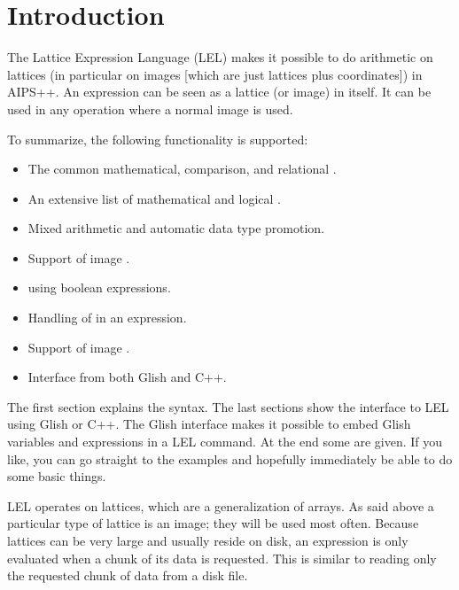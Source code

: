 
\section{Introduction}

The Lattice Expression Language (LEL) makes it possible to do arithmetic
on lattices (in particular on images [which are just lattices plus
coordinates]) in AIPS++.  An expression can be seen as a lattice (or
image) in itself.  It can be used in any operation where a normal image
is used. 

To summarize, the following functionality is supported:
\begin{itemize}
\item The common mathematical, comparison, and relational
      .
\item An extensive list of mathematical and logical
      .
\item Mixed  arithmetic
      and automatic data type promotion.
\item Support of image .
\item {} using boolean expressions.
\item Handling of  in an expression.
\item Support of image .
\item Interface from both Glish and C++.
\end{itemize}

The first section explains the syntax.  The last sections show the
interface to LEL using Glish or C++.  The Glish interface makes it
possible to embed Glish variables and expressions in a LEL command. 
At the end some  are given.  If 
you like, you can go straight to the examples and hopefully immediately
be able to do some basic things.

\medskip\noindent LEL operates on lattices, which are a generalization
of arrays.  As said above a particular type of lattice is an image; they
will be used most often.  Because lattices can be very large and
usually reside on disk, an
expression is only evaluated when a chunk of its data is requested. 
This is similar to reading only the requested chunk of data from a disk
file. 

